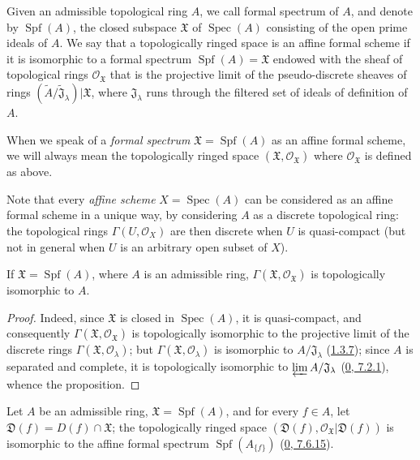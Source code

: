 \begin{definition}[10.1.2]
\label{I.10.1.2}
Given an admissible topological ring $A$, we call formal spectrum
of $A$, and denote by $\operatorname{Spf}(A)$, the closed subspace
$\mathfrak{X}$ of $\operatorname{Spec}(A)$ consisting of the open prime
ideals of $A$. We say that a topologically ringed space is an affine formal
scheme if it is isomorphic to a formal spectrum
$\operatorname{Spf}(A)=\mathfrak{X}$ endowed with the sheaf of topological
rings $\mathscr{O}_{\mathfrak{X}}$ that is the projective limit of the
pseudo-discrete sheaves of rings
$(\widetilde{A}/\widetilde{\mathfrak{J}}_\lambda)|\mathfrak{X}$, where
$\mathfrak{J}_\lambda$ runs through the filtered set of ideals of
definition of $A$.
\end{definition}

When we speak of a \emph{formal spectrum}
$\mathfrak{X}=\operatorname{Spf}(A)$ as an affine formal scheme, we will
always mean the topologically ringed space
$(\mathfrak{X},\mathscr{O}_{\mathfrak{X}})$ where
$\mathscr{O}_{\mathfrak{X}}$ is defined as above.

Note that every \emph{affine scheme} $X=\operatorname{Spec}(A)$ can be
considered as an affine formal scheme in a unique way, by considering
$A$ as a discrete topological ring: the topological rings
$\Gamma(U,\mathscr{O}_X)$ are then discrete when $U$ is
quasi-compact (but not in general when $U$ is an arbitrary open subset of
$X$).

\begin{proposition}[10.1.3]
\label{I.10.1.3}
If $\mathfrak{X}=\operatorname{Spf}(A)$, where $A$ is an admissible ring,
$\Gamma(\mathfrak{X},\mathscr{O}_{\mathfrak{X}})$ is topologically
isomorphic to $A$.
\end{proposition}

\begin{proof}
Indeed, since $\mathfrak{X}$ is closed in $\operatorname{Spec}(A)$, it
is quasi-compact, and consequently
$\Gamma(\mathfrak{X},\mathscr{O}_{\mathfrak{X}})$ is topologically
isomorphic to the projective limit of the discrete rings
$\Gamma(\mathfrak{X},\mathscr{O}_\lambda)$; but
$\Gamma(\mathfrak{X},\mathscr{O}_\lambda)$ is isomorphic to
$A/\mathfrak{J}_\lambda$ (\hyperref[I.1.3.7]{1.3.7}); since $A$ is
separated and complete, it is topologically isomorphic to
$\varprojlim A/\mathfrak{J}_\lambda$
(\hyperref[0.7.2.1]{0, 7.2.1}), whence the proposition.
\end{proof}

\begin{proposition}[10.1.4]
\label{I.10.1.4}
Let $A$ be an admissible ring, $\mathfrak{X}=\operatorname{Spf}(A)$, and
for every $f\in A$, let
$\mathfrak{D}(f)=D(f)\cap\mathfrak{X}$; the topologically ringed space
$(\mathfrak{D}(f),\mathscr{O}_{\mathfrak{X}}|\mathfrak{D}(f))$ is
isomorphic to the affine formal spectrum
$\operatorname{Spf}(A_{\{f\}})$
(\hyperref[0.7.6.15]{0, 7.6.15}).
\end{proposition}

